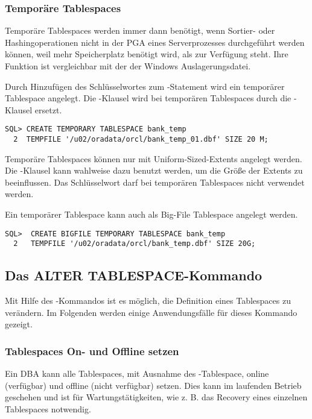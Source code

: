         \subsubsection{Temporäre Tablespaces}
          Temporäre Tablespaces werden immer dann benötigt, wenn Sortier- oder Hashingoperationen nicht in der PGA eines Serverprozesses durchgeführt werden können, weil mehr Speicherplatz benötigt wird, als zur Verfügung steht. Ihre Funktion ist vergleichbar mit der der Windows Auslagerungsdatei.

          Durch Hinzufügen des Schlüsselwortes  zum -Statement wird ein temporärer Tablespace angelegt. Die -Klausel wird bei temporären Tablespaces durch die -Klausel ersetzt.
          \begin{lstlisting}[caption={Einen temporären Tablespace anlegen},label=admin109,language=oracle_sql]
SQL> CREATE TEMPORARY TABLESPACE bank_temp
  2  TEMPFILE '/u02/oradata/orcl/bank_temp_01.dbf' SIZE 20 M;
          \end{lstlisting}
          \begin{merke}
            Temporäre Tablespaces können nur mit Uniform-Sized-Extents angelegt werden. Die -Klausel kann wahlweise dazu benutzt werden, um die Größe der Extents zu beeinflussen. Das Schlüsselwort  darf bei temporären Tablespaces nicht verwendet werden.
          \end{merke}
          Ein temporärer Tablespace kann auch als Big-File Tablespace angelegt werden.
          \begin{lstlisting}[caption={Einen temporären Big-File Tablespace anlegen},label=admin110,language=oracle_sql]
SQL>  CREATE BIGFILE TEMPORARY TABLESPACE bank_temp
  2   TEMPFILE '/u02/oradata/orcl/bank_temp.dbf' SIZE 20G;
          \end{lstlisting}
      \subsection{Das ALTER TABLESPACE-Kommando}
        Mit Hilfe des -Kommandos ist es möglich, die Definition eines Tablespaces zu verändern. Im Folgenden werden einige Anwendungsfälle für dieses Kommando gezeigt.
        \subsubsection{Tablespaces On- und Offline setzen}
          Ein DBA kann alle Tablespaces, mit Ausnahme des -Tablespace, online (verfügbar) und offline (nicht verfügbar) setzen. Dies kann im laufenden Betrieb geschehen und ist für Wartungstätigkeiten, wie z. B. das Recovery eines einzelnen Tablespaces notwendig.

